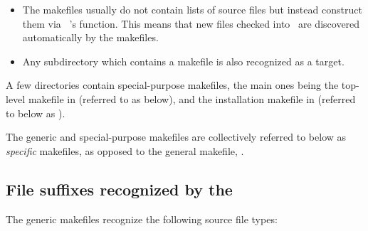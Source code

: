 \begin{itemize}
\item
   The makefiles usually do not contain lists of source files but instead
   construct them via \gnu\ 's  function.  This
   means that new files checked into \aipspp\ are discovered automatically by
   the makefiles.

\item
   Any subdirectory which contains a makefile is also recognized as a target.
\end{itemize}

A few directories contain special-purpose makefiles, the main ones being the
top-level makefile in  (referred to as  below), and
the installation makefile in  (referred to below as
).

The generic and special-purpose makefiles are collectively referred to below
as {\em specific} makefiles, as opposed to the general makefile,
.

\subsection*{File suffixes recognized by the }


The generic makefiles recognize the following source file types:

